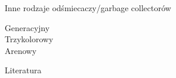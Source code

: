 \documentclass[xcolor=table]{beamer}
\begin{document}
\begin{frame}{Inne rodzaje odśmiecaczy/garbage collectorów}
\begin{block}{}
Generacyjny \\
Trzykolorowy  \\
Arenowy
\end{block}


\end{frame}

\begin{frame}[allowframebreaks]{Literatura}

\begin{thebibliography}{99}

 
\end{thebibliography}

\end{frame}
\end{document}
